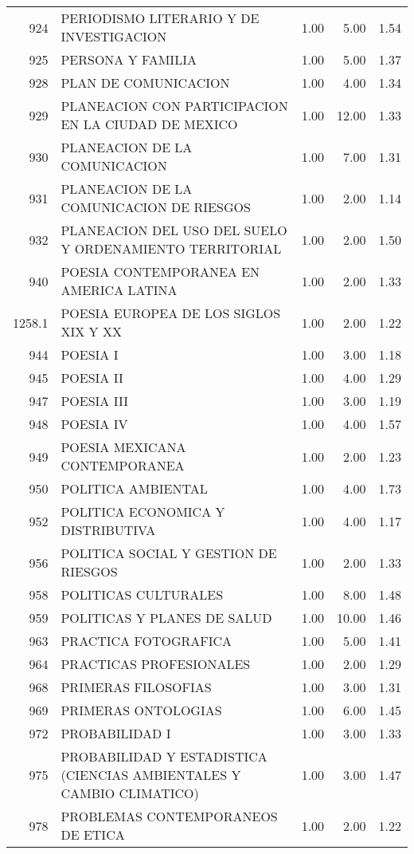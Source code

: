 \documentclass[12pt]{article}
\begin{document}
\begin{table}[ht]
\begin{tabular}{rlrrr}
  924 & PERIODISMO LITERARIO Y DE INVESTIGACION & 1.00 & 5.00 & 1.54 \\ 
  925 & PERSONA Y FAMILIA & 1.00 & 5.00 & 1.37 \\ 
  928 & PLAN DE COMUNICACION & 1.00 & 4.00 & 1.34 \\ 
  929 & PLANEACION CON PARTICIPACION EN LA CIUDAD DE MEXICO & 1.00 & 12.00 & 1.33 \\ 
  930 & PLANEACION DE LA COMUNICACION & 1.00 & 7.00 & 1.31 \\ 
  931 & PLANEACION DE LA COMUNICACION DE RIESGOS & 1.00 & 2.00 & 1.14 \\ 
  932 & PLANEACION DEL USO DEL SUELO Y ORDENAMIENTO TERRITORIAL & 1.00 & 2.00 & 1.50 \\ 
  940 & POESIA CONTEMPORANEA EN AMERICA LATINA & 1.00 & 2.00 & 1.33 \\ 
  1258.1 & POESIA EUROPEA DE LOS SIGLOS XIX Y XX & 1.00 & 2.00 & 1.22 \\ 
  944 & POESIA I & 1.00 & 3.00 & 1.18 \\ 
  945 & POESIA II & 1.00 & 4.00 & 1.29 \\ 
  947 & POESIA III & 1.00 & 3.00 & 1.19 \\ 
  948 & POESIA IV & 1.00 & 4.00 & 1.57 \\ 
  949 & POESIA MEXICANA CONTEMPORANEA & 1.00 & 2.00 & 1.23 \\ 
  950 & POLITICA AMBIENTAL & 1.00 & 4.00 & 1.73 \\ 
  952 & POLITICA ECONOMICA Y DISTRIBUTIVA & 1.00 & 4.00 & 1.17 \\ 
  956 & POLITICA SOCIAL Y GESTION DE RIESGOS & 1.00 & 2.00 & 1.33 \\ 
  958 & POLITICAS CULTURALES & 1.00 & 8.00 & 1.48 \\ 
  959 & POLITICAS Y PLANES DE SALUD & 1.00 & 10.00 & 1.46 \\ 
  963 & PRACTICA FOTOGRAFICA & 1.00 & 5.00 & 1.41 \\ 
  964 & PRACTICAS PROFESIONALES & 1.00 & 2.00 & 1.29 \\ 
  968 & PRIMERAS FILOSOFIAS & 1.00 & 3.00 & 1.31 \\ 
  969 & PRIMERAS ONTOLOGIAS & 1.00 & 6.00 & 1.45 \\ 
  972 & PROBABILIDAD I & 1.00 & 3.00 & 1.33 \\ 
  975 & PROBABILIDAD Y ESTADISTICA (CIENCIAS AMBIENTALES Y CAMBIO CLIMATICO) & 1.00 & 3.00 & 1.47 \\ 
  978 & PROBLEMAS CONTEMPORANEOS DE ETICA & 1.00 & 2.00 & 1.22 \\ 

\end{tabular}
\end{table}
\end{document}
